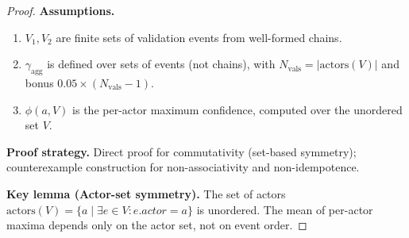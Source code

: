 \begin{proof}
\textbf{Assumptions.}
\begin{enumerate}[label=(A\arabic*),leftmargin=2em]
    \item $V_1, V_2$ are finite sets of validation events from well-formed chains.
    \item $\gamma_{\text{agg}}$ is defined over sets of events (not chains), with $N_{\text{vals}} = |\text{actors}(V)|$ and bonus $0.05 \times (N_{\text{vals}} - 1)$.
    \item $\phi(a, V)$ is the per-actor maximum confidence, computed over the unordered set $V$.
\end{enumerate}

\textbf{Proof strategy.} Direct proof for commutativity (set-based symmetry); counterexample construction for non-associativity and non-idempotence.

\textbf{Key lemma (Actor-set symmetry).} The set of actors $\text{actors}(V) = \{a \mid \exists e \in V : e.\textit{actor} = a\}$ is unordered. The mean of per-actor maxima depends only on the actor set, not on event order.


\end{proof}
